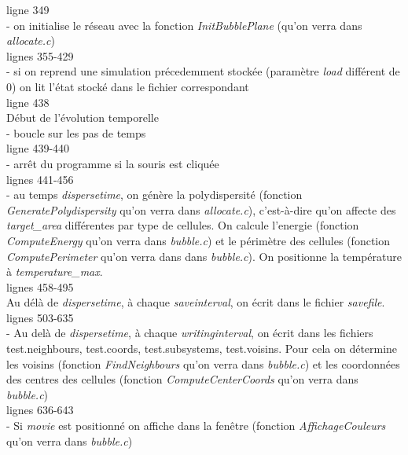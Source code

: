 \documentclass[11pt,a4paper]{article}
\begin{document}
ligne 349\\
- on initialise le réseau avec la fonction \textit{InitBubblePlane} (qu’on verra dans \textit{allocate.c})\\

lignes 355-429\\
- si on reprend une simulation précedemment stockée (paramètre \textit{load} différent de 0) on lit l’état stocké dans le fichier correspondant\\

ligne 438\\
Début de l’évolution temporelle\\
- boucle sur les pas de temps\\

ligne 439-440\\
- arrêt du programme si la souris est cliquée\\

lignes 441-456\\
- au temps \textit{dispersetime}, on génère la polydispersité (fonction \textit{GeneratePolydispersity} qu’on verra dans \textit{allocate.c}), c’est-à-dire qu’on affecte des \textit{target\_area} différentes par type de cellules. On calcule l’energie (fonction \textit{ComputeEnergy} qu’on verra dans \textit{bubble.c}) et le périmètre des cellules (fonction \textit{ComputePerimeter} qu’on verra dans dans \textit{bubble.c}). On positionne la température à \textit{temperature\_max}.\\

lignes 458-495\\
Au délà de \textit{dispersetime}, à chaque \textit{saveinterval}, on écrit dans le fichier \textit{savefile}.\\

lignes 503-635\\
- Au delà de \textit{dispersetime}, à chaque \textit{writinginterval}, on écrit dans les fichiers test.neighbours, test.coords, test.subsystems, test.voisins. Pour cela on détermine les voisins (fonction \textit{FindNeighbours} qu’on verra dans \textit{bubble.c}) et les coordonnées des centres des cellules (fonction \textit{ComputeCenterCoords} qu’on verra dans \textit{bubble.c})\\

lignes 636-643\\
- Si \textit{movie} est positionné on affiche dans la fenêtre (fonction \textit{AffichageCouleurs} qu’on verra dans \textit{bubble.c})\\
\end{document}
